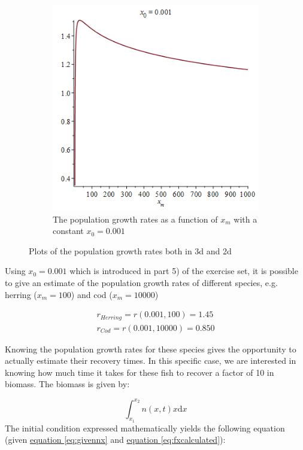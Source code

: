 \documentclass{article}
\numberwithin{equation}{section} %
\newcommand{\md}{\mathrm{d}}
\begin{document}
\begin{figure}[h]
\begin{subfigure}[t]{0.5\textwidth}
\end{subfigure}
\begin{subfigure}[t]{0.5\textwidth}
\includegraphics[width=0.9\linewidth]{exercises/ex4p2}
\caption{The population growth rates as a function of $x_m$ with a constant $x_0 = 0.001$}
\label{fig:e1p2}
\end{subfigure}
\caption{Plots of the population growth rates both in 3d and 2d} 
\label{fig:e1p12}
\end{figure}

Using $x_0=0.001$ which is introduced in part 5) of the exercise set, it is possible to give an estimate of the population growth rates of different species, e.g. herring ($x_m=100$) and cod ($x_m=10000$)

\begin{align}
    r_{Herring} = r(0.001,100) = 1.45\label{eq:r_herring_val}\\
    r_{Cod} = r(0.001,10000) = 0.850\label{eq:r_cod_val}
\end{align}

Knowing the population growth rates for these species gives the opportunity to actually estimate their recovery times. In this specific case, we are interested in knowing how much time it takes for these fish to recover a factor of 10 in biomass. The biomass is given by:

\begin{equation}
	\int_{x_1}^{x_2}n(x,t)x\md x
\end{equation}
The initial condition expressed mathematically yields the following equation (given \hyperref[eq:givennx]{equation \ref{eq:givennx}} and \hyperref[eq:fxcalculated]{equation \ref{eq:fxcalculated}}):
\end{document}
